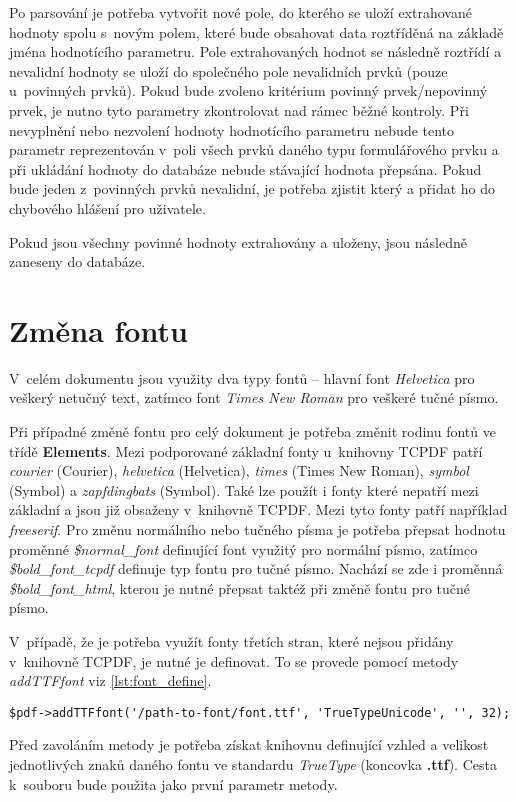 \par
Po parsování je potřeba vytvořit nové pole, do kterého se uloží extrahované hodnoty spolu s~novým polem, které bude obsahovat data roztříděná na základě jména hodnotícího parametru. Pole extrahovaných hodnot se následně roztřídí a nevalidní hodnoty se uloží do společného pole nevalidních prvků (pouze u~povinných prvků). Pokud bude zvoleno kritérium povinný prvek/nepovinný prvek, je nutno tyto parametry zkontrolovat nad rámec běžné kontroly. Při nevyplnění nebo nezvolení hodnoty hodnotícího parametru nebude tento parametr reprezentován v~poli všech prvků daného typu formulářového prvku a při ukládání hodnoty do databáze nebude stávající hodnota přepsána. Pokud bude jeden z~povinných prvků nevalidní, je potřeba zjistit který a přidat ho do chybového hlášení pro uživatele.
\par
Pokud jsou všechny povinné hodnoty extrahovány a uloženy, jsou následně zaneseny do databáze.

\section{Změna fontu}
V~celém dokumentu jsou využity dva typy fontů -- hlavní font \textit{Helvetica} pro veškerý netučný text, zatímco font \textit{Times New Roman} pro veškeré tučné písmo.
\par
Při případné změně fontu pro celý dokument je potřeba změnit rodinu fontů ve třídě \textbf{Elements}. Mezi podporované základní fonty u~knihovny TCPDF patří \textit{courier} (Courier), \textit{helvetica} (Helvetica), \textit{times} (Times New Roman), \textit{symbol} (Symbol) a \textit{zapfdingbats} (Symbol). Také lze použít i fonty které nepatří mezi základní a jsou již obsaženy v~knihovně TCPDF. Mezi tyto fonty patří například \textit{freeserif}. Pro změnu normálního nebo tučného písma je potřeba přepsat hodnotu proměnné \textit{\$normal\_font} definující font využitý pro normální písmo, zatímco \textit{\$bold\_font\_tcpdf} definuje typ fontu pro tučné písmo. Nachází se zde i proměnná \textit{\$bold\_font\_html}, kterou je nutné přepsat taktéž při změně fontu pro tučné písmo.
\par
V~případě, že je potřeba využít fonty třetích stran, které nejsou přidány v~knihovně TCPDF, je nutné je definovat. To se provede pomocí metody \textit{addTTFfont} viz  \ref{lst:font_define}.
\begin{lstlisting}[caption = {Nový font vložený do knihovny TCPDF}, label = {lst:font_define}, captionpos=b]
$pdf->addTTFfont('/path-to-font/font.ttf', 'TrueTypeUnicode', '', 32);
\end{lstlisting}
Před zavoláním metody je potřeba získat knihovnu definující vzhled a velikost jednotlivých znaků daného fontu ve standardu \textit{TrueType} (koncovka \textbf{.ttf}). Cesta k~souboru bude použita jako první parametr metody.

